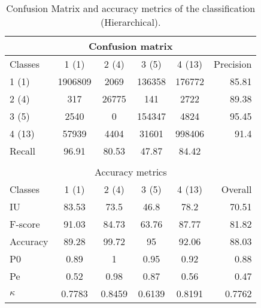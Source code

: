 \begin{table}[H]
\begin{center}
\footnotesize
\begin{tabular}{|l|c|c|c|c|r|}
\hline
\multicolumn{6}{|c|}{Confusion matrix} \\
\hline
 Classes & 1 (1) & 2 (4) & 3 (5) & 4 (13) & Precision \\
\hline
1 (1) & 1906809 & 2069 & 136358 & 176772 & 85.81 \\
\hline
2 (4) & 317 & 26775 & 141 & 2722 & 89.38 \\
\hline
3 (5) & 2540 & 0 & 154347 & 4824 & 95.45 \\
\hline
4 (13) & 57939 & 4404 & 31601 & 998406 & 91.4 \\
\hline
Recall & 96.91 & 80.53 & 47.87 & 84.42 &  \\
\hline
\multicolumn{6}{c}{ } \\
\hline
\multicolumn{6}{|c|}{Accuracy metrics} \\
\hline
 Classes & 1 (1) & 2 (4) & 3 (5) & 4 (13) & Overall \\
\hline
IU & 83.53 & 73.5 & 46.8 & 78.2 & 70.51 \\
\hline
F-score & 91.03 & 84.73 & 63.76 & 87.77 & 81.82 \\
\hline
Accuracy & 89.28 & 99.72 & 95 & 92.06 & 88.03 \\
\hline
P0 & 0.89 & 1 & 0.95 & 0.92 & 0.88 \\
\hline
Pe & 0.52 & 0.98 & 0.87 & 0.56 & 0.47 \\
\hline
$\kappa$ & 0.7783 & 0.8459 & 0.6139 & 0.8191 & 0.7762 \\
\hline
\end{tabular}
\caption{Confusion Matrix and accuracy metrics of the classification (Hierarchical).}
\label{table:}
\end{center}
\end{table}
